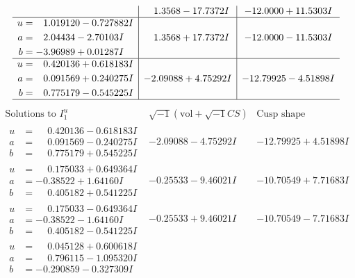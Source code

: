 \documentclass[1p]{elsarticle_modified}
\theoremstyle{definition}
\newcommand{\I}{\sqrt{-1}}
\begin{document}
$$\begin{array}{c|c|c}
 & \phantom{-}1.3568 - 17.7372 I & -12.0000 + 11.5303 I \\ \hline\begin{aligned}
u &= \phantom{-}1.019120 - 0.727882 I \\
a &= \phantom{-}2.04434 - 2.70103 I \\
b &= -3.96989 + 0.01287 I\end{aligned}
 & \phantom{-}1.3568 + 17.7372 I & -12.0000 - 11.5303 I \\ \hline\begin{aligned}
u &= \phantom{-}0.420136 + 0.618183 I \\
a &= \phantom{-}0.091569 + 0.240275 I \\
b &= \phantom{-}0.775179 - 0.545225 I\end{aligned}
 & -2.09088 + 4.75292 I & -12.79925 - 4.51898 I\\
 \hline 
 \end{array}$$\newpage$$\begin{array}{c|c|c}  
\text{Solutions to }I^u_{1}& \I (\text{vol} + \sqrt{-1}CS) & \text{Cusp shape}\\
 \hline 
\begin{aligned}
u &= \phantom{-}0.420136 - 0.618183 I \\
a &= \phantom{-}0.091569 - 0.240275 I \\
b &= \phantom{-}0.775179 + 0.545225 I\end{aligned}
 & -2.09088 - 4.75292 I & -12.79925 + 4.51898 I \\ \hline\begin{aligned}
u &= \phantom{-}0.175033 + 0.649364 I \\
a &= -0.38522 + 1.64160 I \\
b &= \phantom{-}0.405182 + 0.541225 I\end{aligned}
 & -0.25533 - 9.46021 I & -10.70549 + 7.71683 I \\ \hline\begin{aligned}
u &= \phantom{-}0.175033 - 0.649364 I \\
a &= -0.38522 - 1.64160 I \\
b &= \phantom{-}0.405182 - 0.541225 I\end{aligned}
 & -0.25533 + 9.46021 I & -10.70549 - 7.71683 I \\ \hline\begin{aligned}
u &= \phantom{-}0.045128 + 0.600618 I \\
a &= \phantom{-}0.796115 - 1.095320 I \\
b &= -0.290859 - 0.327309 I\end{aligned}

\end{array}$$
\end{document}
